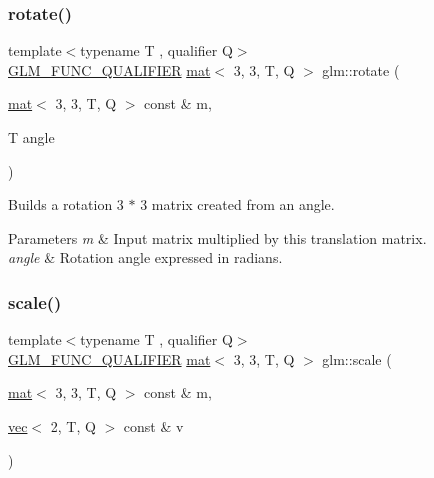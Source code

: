 \subsubsection{\texorpdfstring{rotate()}{rotate()}}
{\footnotesize\ttfamily template$<$typename T , qualifier Q$>$ \\
\mbox{\hyperlink{setup_8hpp_a33fdea6f91c5f834105f7415e2a64407}{G\+L\+M\+\_\+\+F\+U\+N\+C\+\_\+\+Q\+U\+A\+L\+I\+F\+I\+ER}} \mbox{\hyperlink{structglm_1_1mat}{mat}}$<$ 3, 3, T, Q $>$ glm\+::rotate (\begin{DoxyParamCaption}\item[{\mbox{\hyperlink{structglm_1_1mat}{mat}}$<$ 3, 3, T, Q $>$ const \&}]{m,  }\item[{T}]{angle }\end{DoxyParamCaption})}

Builds a rotation 3 $\ast$ 3 matrix created from an angle.


\begin{DoxyParams}{Parameters}
{\em m} & Input matrix multiplied by this translation matrix. \\
\hline
{\em angle} & Rotation angle expressed in radians. \\
\hline
\end{DoxyParams}
\mbox{\label{group__gtx__matrix__transform__2d_ga6fd2493e8271ee595898e9b3d434c1a7}} 
\subsubsection{\texorpdfstring{scale()}{scale()}}
{\footnotesize\ttfamily template$<$typename T , qualifier Q$>$ \\
\mbox{\hyperlink{setup_8hpp_a33fdea6f91c5f834105f7415e2a64407}{G\+L\+M\+\_\+\+F\+U\+N\+C\+\_\+\+Q\+U\+A\+L\+I\+F\+I\+ER}} \mbox{\hyperlink{structglm_1_1mat}{mat}}$<$ 3, 3, T, Q $>$ glm\+::scale (\begin{DoxyParamCaption}\item[{\mbox{\hyperlink{structglm_1_1mat}{mat}}$<$ 3, 3, T, Q $>$ const \&}]{m,  }\item[{\mbox{\hyperlink{structglm_1_1vec}{vec}}$<$ 2, T, Q $>$ const \&}]{v }\end{DoxyParamCaption})}

